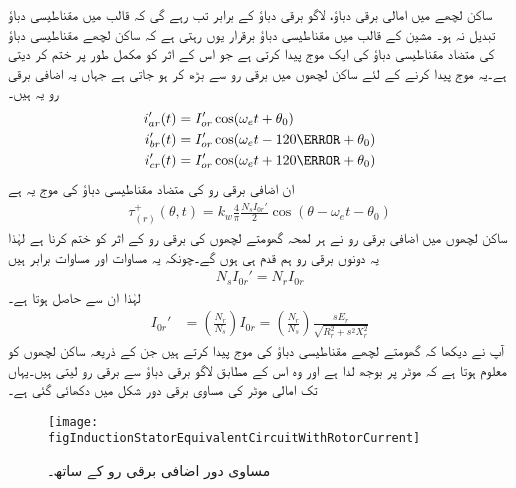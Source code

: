 ساکن لچھے میں امالی برقی دباؤ،  لاگو برقی دباؤ کے برابر تب رہے گی کہ قالب میں مقناطیسی دباؤ تبدیل نہ ہو۔ مشین کے قالب میں مقناطیسی دباؤ برقرار یوں رہتی ہے کہ ساکن لچھے  مقناطیسی دباؤ   کی متضاد مقناطیسی دباؤ کی ایک موج پیدا کرتی ہے جو اس کے اثر کو مکمل طور پر ختم کر دیتی ہے۔یہ موج پیدا کرنے کے لئے ساکن لچھوں میں برقی رو  سے بڑھ کر  ہو جاتی ہے جہاں یہ اضافی برقی رو یہ ہیں۔
\begin{gather}
\begin{aligned}\label{مساوات_امالی_تین_رو_الف}
i_{ar}'(t)&=I_{or}' \cos (\omega_e t+\theta_0)\\
i_{br}'(t)&=I_{or}' \cos (\omega_e t-120\degree+\theta_0)\\
i_{cr}'(t)&=I_{or}' \cos (\omega_e t+120\degree+\theta_0)
\end{aligned}
\end{gather}
ان اضافی برقی رو کی متضاد مقناطیسی دباؤ کی موج یہ ہے
\begin{align}
\tau_{(r)}^+(\theta,t)=k_w \frac{4}{\pi}\frac{N_s I_{0r}'}{2} \cos (\theta-\omega_e t -\theta_0)
\end{align}
ساکن لچھوں میں اضافی برقی رو نے ہر لمحہ گھومتے لچھوں کی برقی رو کے اثر کو ختم کرنا ہے لہٰذا یہ دونوں برقی رو ہم قدم ہی ہوں گے۔چونکہ یہ مساوات اور مساوات   برابر ہیں
\begin{align}
N_s I_{0r}'=N_r I_{0r}
\end{align}
 لہٰذا ان سے حاصل ہوتا ہے۔
\begin{align}
I_{0r}'&=\left(\frac{N_r}{N_s}\right) I_{0r}=\left(\frac{N_r}{N_s}\right) \frac{s E_r}{\sqrt{R_r^2+s^2 X_r^2}}
\end{align}
آپ نے دیکھا کہ گھومتے لچھے مقناطیسی دباؤ کی موج پیدا کرتے ہیں جن کے ذریعہ ساکن لچھوں کو معلوم ہوتا ہے کہ موٹر پر بوجھ لدا ہے اور وہ اس کے مطابق لاگو برقی دباؤ سے برقی رو لیتی ہیں۔یہاں تک امالی موٹر کی مساوی برقی دور شکل   میں دکھائی گئی ہے۔
\begin{figure}
\centering
\texttt{[image: figInductionStatorEquivalentCircuitWithRotorCurrent]}
\caption{مساوی دور اضافی برقی رو کے ساتھ۔}
\label{شکل_امالی_ساکن_کا_مساوی_دور_بمع_گھومتے_لچھے_کی_رو}
\end{figure}

